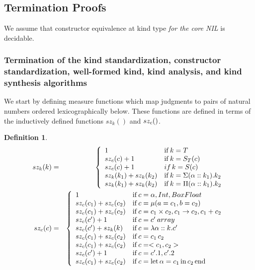 \documentclass[12pt,twoside,fleqn]{amsart}
\theoremstyle{plain}
\theoremstyle{plain}
\theoremstyle{definition}
\newtheorem{defn}{Definition}
\begin{document}
\subsection{Termination Proofs}

We assume that constructor equivalence at kind type \emph{for the core NIL}
is decidable. 


\subsubsection{Termination of the kind standardization, constructor standardization, well-formed
kind, kind analysis, and kind synthesis algorithms}


\newcommand{\KSmeas}[1]{SZ_{\backslash k}(#1 )}

\newcommand{\CSmeas}[1]{SZ_{\backslash c}(#1 )}

\newcommand{\ksmeas}[3]{\KSmeas{\kstandard{#1 }{#2 }{#3 }}}

\newcommand{\csmeas}[3]{\CSmeas{\cstandard{#1 }{#2 }{#3 }}}


\renewcommand{\ksz}[1]{sz_k(#1)}
\renewcommand{\Kmeas}[1]{SZ_k(#1)}

We start by defining measure functions which map judgments to pairs of natural
numbers ordered lexicographically below. These functions are defined in terms
of the inductively defined functions \( \ksz{} \) and \( sz_{c}( ) \).

\begin{defn}

\begin{eqnarray*}
\ksz{k} & = & \left\{ \begin{array}{ll}
1 & \mathrm{if}\, k=T\\
\csz{c}+1 & \mathrm{if}\, k=\st{c}\\
\csz{c}+1 & if\, k=S(c)\\
\ksz{k_{1}}+\ksz{k_{2}} & \mathrm{if}\, k=\Sigma (\alpha ::k_{1}).k_{2}\\
\ksz{k_{1}}+\ksz{k_{2}} & \mathrm{if}\, k=\Pi (\alpha ::k_{1}).k_{2}
\end{array}\right. \\
\csz{c} & = & \left\{ \begin{array}{ll}
1 & \mathrm{if}\, c=\alpha ,Int,BoxFloat\\
\csz{c_{1}}+\csz{c_{2}} & \mathrm{if}\, c=\mu (a=c_{1},b=c_{2})\\
\csz{c_{1}}+\csz{c_{2}} & \mathrm{if}\, c=c_{1}\times c_{2},c_{1}\rightarrow c_{2},c_{1}+c_{2}\\
\csz{c'}+1 & \mathrm{if}\, \carray{c=c'}\\
\csz{c'}+\ksz{k} & \mathrm{if}\, c=\Lam{\alpha }{k}{c'}\\
\csz{c_{1}}+\csz{c_{2}} & \mathrm{if}\, c=c_{1}\, c_{2}\\
\csz{c_{1}}+\csz{c_{2}} & \mathrm{if}\, c=<c_{1},c_{2}>\\
\csz{c'}+1 & \mathrm{if}\, c=c'.1,c'.2\\
\csz{c_{1}}+\csz{c_{2}} & \mathrm{if}\, c=\Let{\alpha }{c_{1}}{c_{2}}
\end{array}\right. 
\end{eqnarray*}

\end{defn}
%
\end{document}
